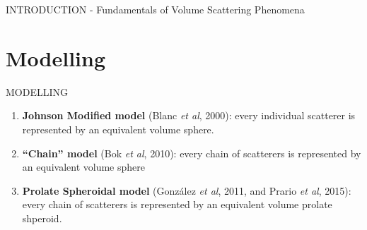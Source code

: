 \documentclass[handout]{beamer}
\newcommand\Fontable{\fontsize{9}{10}\selectfont}
\begin{document}
\begin{frame}{INTRODUCTION - Fundamentals of Volume Scattering Phenomena}
\end{frame}

\section{Modelling}


\begin{frame}{MODELLING}
\Fontable
{}

\begin{minipage}[c]{1\linewidth}
\begin{minipage}[c]{0.6\linewidth}


\begin{enumerate}
\item<3-> \textbf{Johnson Modified model} (Blanc \textit{et al}, 2000): every individual scatterer is represented by an equivalent volume sphere.

\vspace{1cm}
\item<4-> \textbf{``Chain'' model} (Bok \textit{et al}, 2010): every chain of scatterers is represented by an equivalent volume sphere

\vspace{1.2cm}
\item<5-> \textbf{Prolate Spheroidal model} (González \textit{et al}, 2011, and Prario \textit{et al}, 2015): every chain of scatterers is represented by an equivalent volume prolate shperoid.
\end{enumerate}


\end{minipage}
\end{minipage}
\end{frame}
\end{document}
